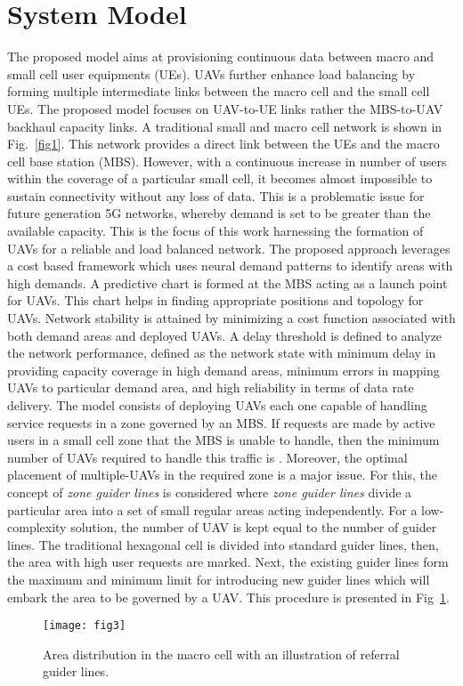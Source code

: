 \documentclass[journal]{IEEEtran}
\begin{document}
\section{System Model}
The proposed model aims at provisioning continuous data between macro and small cell user equipments (UEs). UAVs further enhance load balancing by forming multiple intermediate links between the macro cell and the small cell UEs. The proposed model focuses on UAV-to-UE links rather the MBS-to-UAV backhaul capacity links. A traditional small and macro cell network is shown in Fig.~\ref{fig1}. This network provides a direct link between the UEs and the macro cell base station (MBS). However, with a continuous increase in number of users within the coverage of a particular small cell, it becomes almost impossible to sustain connectivity without any loss of data. This is a problematic issue for future generation 5G networks, whereby demand is set to be greater than the available capacity. This is the focus of this work harnessing the formation of UAVs for a reliable and load balanced network. The proposed approach leverages a cost based framework which uses neural demand patterns to identify areas with high demands. A predictive chart is formed at the MBS acting as a launch point for UAVs. This chart helps in finding appropriate positions and topology for UAVs. Network stability is attained by minimizing a cost function associated with both demand areas and deployed UAVs. A delay threshold is defined to analyze the network performance, defined as the network state with minimum delay in providing capacity coverage in high demand areas, minimum errors in mapping UAVs to particular demand area, and high reliability in terms of data rate delivery. The model consists of deploying  UAVs each one capable of handling  service requests in a zone governed by an MBS. If  requests are made by active users in a small cell zone that the MBS is unable to handle, then the minimum number of UAVs required to handle this traffic is . Moreover, the optimal placement of multiple-UAVs in the required zone is a major issue. For this, the concept of \emph{zone guider lines} is considered where \emph{zone guider lines} divide a particular area into a set of small regular areas acting independently. For a low-complexity solution, the number of UAV is kept equal to the number of guider lines. The traditional hexagonal cell is divided into standard guider lines, then, the area with high user requests are marked. Next, the existing guider lines form the maximum and minimum limit for introducing new guider lines which will embark the area to be governed by a UAV. This procedure is presented in Fig~\ref{fig3}.
\begin{figure}[!hb]
  \centering
\texttt{[image: fig3]}\\
  \caption{Area distribution in the macro cell with an illustration of referral guider lines.}\label{fig3}
\end{figure}
\end{document}
